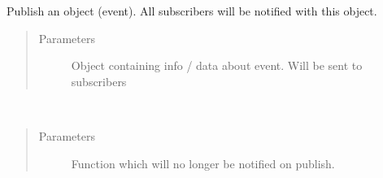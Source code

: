 \documentclass[letterpaper,10pt,english]{sphinxmanual}
\begin{document}
\begin{fulllineitems}
\begin{fulllineitems}
\begin{quote}
\begin{description}
\end{description}\end{quote}

\end{fulllineitems}


\begin{fulllineitems}
\label{\detokenize{models/blockobserver:models.blockobserver.SimpleEventPublisher.publish}}
\sphinxAtStartPar
Publish an object (event). All subscribers will be notified with this object.
\begin{quote}\begin{description}
\item[{Parameters}] \leavevmode
\sphinxAtStartPar
{} \textendash{} Object containing info / data about event. Will be sent to subscribers

\end{description}\end{quote}

\end{fulllineitems}


\begin{fulllineitems}
\label{\detokenize{models/blockobserver:models.blockobserver.SimpleEventPublisher.remove_subscriber}}~\begin{quote}\begin{description}
\item[{Parameters}] \leavevmode
\sphinxAtStartPar
{} \textendash{} Function which will no longer be notified on publish.

\end{description}\end{quote}

\end{fulllineitems}



\end{fulllineitems}
\end{document}
